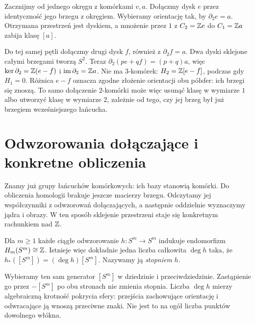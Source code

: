 \begin{przyklad}
\label{prz:dwa-dyski-homologia-8}
Zacznijmy od jednego okręgu z komórkami $v,a$.
Dołączmy dysk $e$ przez identyczność jego brzegu z okręgiem.
Wybieramy orientację tak, by $\partial_2e=a$.
Otrzymana przestrzeń jest dyskiem, a mnożenie przez $1$
z $C_2=\mathbb{Z} e$ do $C_1=\mathbb{Z} a$ zabija klasę $[a]$.

Do tej samej pętli dołączmy drugi dysk $f$, również z
$\partial_2f=a$. Dwa dyski sklejone całymi brzegami tworzą $S^2$.
Teraz $\partial_2(pe+qf)=(p+q)a$, więc
$\ker\partial_2=\mathbb{Z}(e-f)$ i $\operatorname{im}\partial_2=\mathbb{Z} a$.
Nie ma $3$-komórek: $H_2=\mathbb{Z}[e-f]$, podczas gdy $H_1=0$.
Różnica $e-f$ oznacza zgodne złożenie orientacji obu półsfer:
ich brzegi się znoszą. To samo dołączenie $2$-komórki może więc
usunąć klasę w wymiarze $1$ albo utworzyć klasę w wymiarze $2$,
zależnie od tego, czy jej brzeg był już brzegiem wcześniejszego łańcucha.
\end{przyklad}

\section{Odwzorowania dołączające i konkretne obliczenia}
\label{sec:obliczenia-homologii}

Znamy już grupy łańcuchów komórkowych: ich bazy stanowią komórki.
Do obliczenia homologii brakuje jeszcze macierzy brzegu.
Odczytamy jej współczynniki z odwzorowań dołączających,
a następnie oddzielnie wyznaczymy jądra i obrazy.
W ten sposób sklejenie przestrzeni staje się
konkretnym rachunkiem nad $\mathbb{Z}$.

\begin{definicja}
\label{def:stopien-sfer}
Dla $m\geq1$ każde ciągłe odwzorowanie
$h:S^m\to S^m$ indukuje
endomorfizm $H_m(S^m)\cong\mathbb{Z}$.
Istnieje więc dokładnie jedna
liczba całkowita $\deg h$ taka,
że $h_*([S^m])=(\deg h)[S^m]$.
Nazywamy ją \emph{stopniem} $h$.
\end{definicja}

Wybieramy ten sam generator $[S^m]$ w dziedzinie i przeciwdziedzinie.
Zastąpienie go przez $-[S^m]$ po obu stronach nie zmienia stopnia.
Liczba $\deg h$ mierzy algebraiczną krotność pokrycia sfery:
przejścia zachowujące orientację i odwracające ją wnoszą przeciwne znaki.
Nie jest to na ogół liczba punktów dowolnego włókna.

